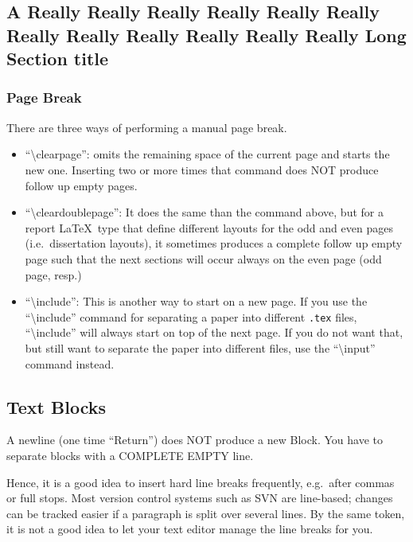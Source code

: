 \subsection{A Really Really Really Really Really Really Really Really Really Really Really Really Long Section title}
\subsubsection{Page Break}

There are three ways of performing a manual page break.
\begin{itemize}
  \item ``\textbackslash{}clearpage'': omits the remaining space of the
current page and starts the new one. Inserting two or more times that
command does NOT produce follow up empty pages.
  \item ``\textbackslash{}cleardoublepage'': It does the same than the
command above, but for a report \LaTeX\ type that define different
layouts for the odd and even pages (i.e.\ dissertation layouts), it
sometimes produces a complete follow up empty page such that the next
sections will occur always on the even page (odd page, resp.)
  \item ``\textbackslash{}include'': This is another way to start on a
new page. If you use the ``\textbackslash{}include''
command for separating a paper
into different \texttt{.tex} files,
``\textbackslash{}include'' will always start on
top of the next page. If you do not want that, but still want to
separate the paper into different files,
use the ``\textbackslash{}input''
command instead.
\end{itemize}

\clearpage

\cleardoublepage

\subsection{Text Blocks}

A newline (one time ``Return'') does NOT produce a new Block.
You have to separate blocks with a COMPLETE EMPTY line.

Hence, it is a good idea to insert hard line breaks frequently,
e.g.~after commas or full stops.
Most version control systems such as SVN are line-based;
changes can be tracked easier if a paragraph is split
over several lines.
By the same token, it is not a good idea to let your text editor
manage the line breaks for you.

